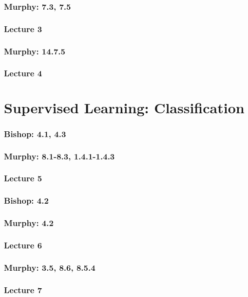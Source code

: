 \documentclass[english, 11pt]{article}
\begin{document}
		\subsubsection{Murphy: 7.3, 7.5}
		\subsubsection{Lecture 3}

		\subsubsection{Murphy: 14.7.5}
		\subsubsection{Lecture 4}

\section{Supervised Learning: Classification}
		\subsubsection{Bishop: 4.1, 4.3}
		\subsubsection{Murphy: 8.1-8.3, 1.4.1-1.4.3}
		\subsubsection{Lecture 5}

		\subsubsection{Bishop: 4.2}
		\subsubsection{Murphy: 4.2}
		\subsubsection{Lecture 6}

		\subsubsection{Murphy: 3.5, 8.6, 8.5.4}
		\subsubsection{Lecture 7}
\end{document}
